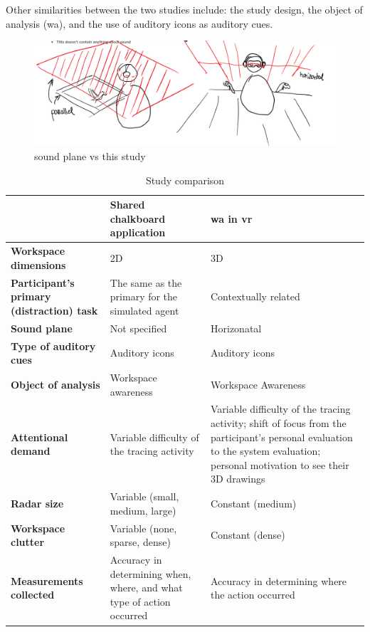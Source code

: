 Other similarities between the two studies include: the study design, the object of analysis (\gls{wa}), and the use of auditory icons as auditory cues.

\begin{figure}[h]
	\centering
	\includegraphics[width=0.7\linewidth]{figures/gutwin_vs_my_study_sound_plane}
	\caption{\cite{gutwin_chalk_2011} sound plane vs this study}
	\label{fig:gutwinvsmystudysoundplane}
\end{figure}

\begin{table}[h]
  \caption{Study comparison}
  \label{table:study_comp}
  \begin{tabular}{|l|l|l|}
  \hline
                             & \textbf{Shared chalkboard application}                & \textbf{\gls{wa} in \gls{vr}}           \\ \hline
  \textbf{Workspace dimensions}				 & 2D									   & 3D \\ \hline
  \textbf{Participant's primary (distraction) task} & The same as the primary for the simulated agent & Contextually related \\ \hline
  \textbf{Sound plane}      & Not specified             & Horizonatal          \\ \hline
  \textbf{Type of auditory cues}                 & Auditory icons        & Auditory icons       \\ \hline
  \textbf{Object of analysis}         & Workspace awareness   & Workspace Awareness  \\ \hline
	\textbf{Attentional demand}         & Variable difficulty of the tracing activity   & Variable difficulty of the tracing activity; shift of focus from the participant's personal evaluation to the system evaluation; personal motivation to see their 3D drawings \\ \hline
	  \textbf{Radar size}         & Variable (small, medium, large)   & Constant (medium)  \\ \hline
	    \textbf{Workspace clutter}         & Variable (none, sparse, dense)   & Constant (dense)  \\ \hline
	    \textbf{Measurements collected}         & Accuracy in determining when, where, and what type of action occurred   & Accuracy in determining where the action occurred  \\ \hline
  \end{tabular}
\end{table}

